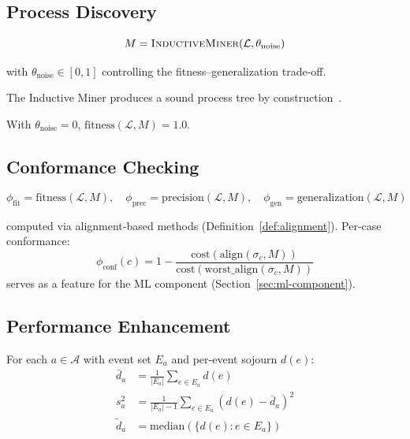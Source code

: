 \subsection{Process Discovery}
\label{sec:s2-discovery}

\begin{equation}
\label{eq:discovery}
M = \textsc{InductiveMiner}(\mathcal{L}, \theta_{\text{noise}})
\end{equation}

with $\theta_{\text{noise}} \in [0, 1]$ controlling the
fitness--generalization trade-off.

\begin{property}
\label{prop:soundness}
The Inductive Miner produces a sound process tree by
construction~\cite{leemans2013discovering}.
\end{property}

\begin{property}
\label{prop:fitness}
With $\theta_{\text{noise}} = 0$, $\text{fitness}(\mathcal{L}, M) = 1.0$.
\end{property}


\subsection{Conformance Checking}
\label{sec:s2-conformance}

\begin{equation}
\label{eq:conformance}
\phi_{\text{fit}} = \text{fitness}(\mathcal{L}, M), \quad
\phi_{\text{prec}} = \text{precision}(\mathcal{L}, M), \quad
\phi_{\text{gen}} = \text{generalization}(\mathcal{L}, M)
\end{equation}

computed via alignment-based methods (Definition~\ref{def:alignment}).
Per-case conformance:
\begin{equation}
\label{eq:case-conformance}
\phi_{\text{conf}}(c) = 1 - \frac{\text{cost}(\text{align}(\sigma_c, M))}
    {\text{cost}(\text{worst\_align}(\sigma_c, M))}
\end{equation}
serves as a feature for the ML component (Section~\ref{sec:ml-component}).


\subsection{Performance Enhancement}
\label{sec:s2-enhancement}

\begin{definition}
\label{def:performance-metrics}
For each $a \in \mathcal{A}$ with event set $E_a$ and per-event sojourn
$d(e)$:
\begin{align}
\bar{d}_a   &= \tfrac{1}{|E_a|} \sum_{e \in E_a} d(e)   \label{eq:mean-sojourn} \\
s_a^2       &= \tfrac{1}{|E_a|-1} \sum_{e \in E_a} (d(e) - \bar{d}_a)^2 \label{eq:var-sojourn} \\
\tilde{d}_a &= \text{median}(\{d(e) : e \in E_a\})       \label{eq:median-sojourn}
\end{align}
\end{definition}

